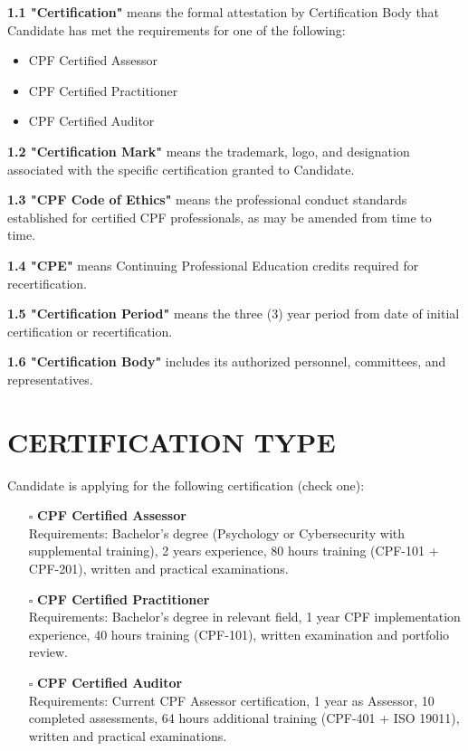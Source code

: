 \documentclass[11pt,a4paper]{article}
\begin{document}
\textbf{1.1 "Certification"} means the formal attestation by Certification Body that Candidate has met the requirements for one of the following:
\begin{itemize}
\item CPF Certified Assessor
\item CPF Certified Practitioner
\item CPF Certified Auditor
\end{itemize}

\textbf{1.2 "Certification Mark"} means the trademark, logo, and designation associated with the specific certification granted to Candidate.

\textbf{1.3 "CPF Code of Ethics"} means the professional conduct standards established for certified CPF professionals, as may be amended from time to time.

\textbf{1.4 "CPE"} means Continuing Professional Education credits required for recertification.

\textbf{1.5 "Certification Period"} means the three (3) year period from date of initial certification or recertification.

\textbf{1.6 "Certification Body"} includes its authorized personnel, committees, and representatives.

\section{CERTIFICATION TYPE}

Candidate is applying for the following certification (check one):

\begin{itemize}
\item[$\square$] \textbf{CPF Certified Assessor}\\
Requirements: Bachelor's degree (Psychology or Cybersecurity with supplemental training), 2 years experience, 80 hours training (CPF-101 + CPF-201), written and practical examinations.

\item[$\square$] \textbf{CPF Certified Practitioner}\\
Requirements: Bachelor's degree in relevant field, 1 year CPF implementation experience, 40 hours training (CPF-101), written examination and portfolio review.

\item[$\square$] \textbf{CPF Certified Auditor}\\
Requirements: Current CPF Assessor certification, 1 year as Assessor, 10 completed assessments, 64 hours additional training (CPF-401 + ISO 19011), written and practical examinations.
\end{itemize}
\end{document}

